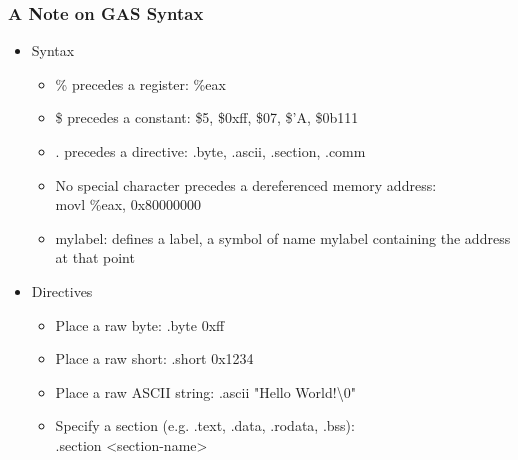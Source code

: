 \documentclass[11pt,xcolor=dvipsnames]{beamer}
\begin{document}
\begin{frame}[fragile,t]
\frametitle{A Note on GAS Syntax}
\begin{itemize}
    \item Syntax
    \begin{itemize}
        \item {\ttfamily \%} precedes a register: {\ttfamily \%eax}
        \item {\ttfamily \$} precedes a constant: {\ttfamily \$5, \$0xff, \$07, \$'A, \$0b111}
        \item {\ttfamily .} precedes a directive: {\ttfamily .byte, .ascii, .section, .comm}
        \item No special character precedes a dereferenced memory address: \\ {\ttfamily movl \%eax, 0x80000000}
        \item {\ttfamily mylabel:} defines a label, a symbol of name {\ttfamily mylabel} containing the address at that point
    \end{itemize}
    \item Directives
    \begin{itemize}
        \item Place a raw byte: {\ttfamily .byte 0xff}
        \item Place a raw short: {\ttfamily .short 0x1234}
        \item Place a raw ASCII string: {\ttfamily .ascii "Hello World!\textbackslash0"}
        \item Specify a section (e.g. .text, .data, .rodata, .bss): \\ {\ttfamily .section <section-name>}
    \end{itemize}
\end{itemize}
\end{frame}
\end{document}
